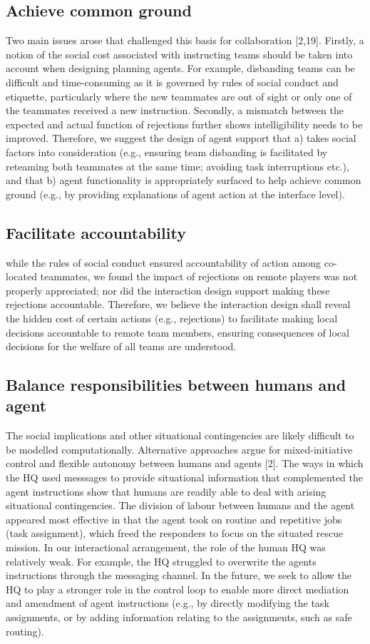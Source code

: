 \subsection{Achieve common ground}  
Two main issues arose that challenged this basis for collaboration [2,19]. Firstly, a notion of the social cost associated with instructing teams should be taken into account when designing planning agents. For example, disbanding teams can be difficult and time-consuming as it is governed by rules of social conduct and etiquette, particularly where the new teammates are out of sight or only one of the teammates received a new instruction. Secondly, a mismatch between the expected and actual function of rejections further shows intelligibility needs to be improved. Therefore, we suggest the design of agent support that a) takes social factors into consideration (e.g., ensuring team disbanding is facilitated by reteaming both teammates at the same time; avoiding task interruptions etc.), and that b) agent functionality is appropriately surfaced to help achieve common ground (e.g., by providing explanations of agent action at the interface level).

\subsection{Facilitate accountability}
while the rules of social conduct ensured accountability of action among co-located teammates, we found the impact of rejections on remote players was not properly appreciated; nor did the interaction design support making these rejections accountable. Therefore, we believe the interaction design shall reveal the hidden cost of certain actions (e.g., rejections) to facilitate making local decisions accountable to remote team members, ensuring consequences of local decisions for the welfare of all teams are understood. 

\subsection{Balance responsibilities between humans and agent}
 The social implications and other situational contingencies are likely difficult to be modelled computationally. Alternative approaches argue for mixed-initiative  control and flexible autonomy between humans and agents [2]. The ways in which the HQ used messsages to provide situational information that complemented the agent instructions show that humans are readily able to deal with arising situational contingencies. The division of labour between humans and the agent appeared most effective in that the agent took on routine and repetitive jobs (task assignment), which freed the responders to focus on the situated rescue mission. In our interactional arrangement, the role of the human HQ was relatively weak. For example, the HQ struggled to overwrite the agents instructions through the messaging channel. In the future, we seek to allow the HQ to play a stronger role in the control loop to enable more direct mediation and amendment of agent instructions (e.g., by directly modifying the task assignments, or by adding information relating to the assignments, such as safe routing).
 
